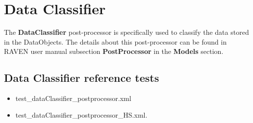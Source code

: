 \section{Data Classifier}
\label{sec:dataClassifier}

The \textbf{DataClassifier} post-processor is specifically used to classify the data stored in the DataObjects.
The details about this post-processor can be found in RAVEN user manual subsection \textbf{PostProcessor}
in the \textbf{Models} section.

\subsection{Data Classifier reference tests}
\begin{itemize}
	\item test\_dataClassifier\_postprocessor.xml
  \item test\_dataClassifier\_postprocessor\_HS.xml.
\end{itemize}
